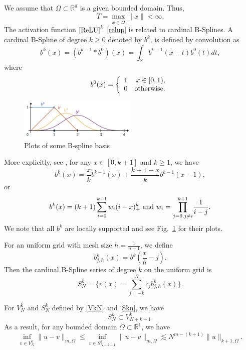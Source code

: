We assume that $\Omega\subset\mathbb R^d$ is a given bounded domain.
Thus,
\begin{equation}
  \label{T}
T=\max_{x\in \bar{\Omega}} \|x\|<\infty.  
\end{equation}
The activation function ${\rm [ ReLU]}^k$ \eqref{relup} is related to
cardinal B-Splines.  A cardinal B-Spline of degree $k\ge 0$
denoted by $b^k$, is defined by convolution as
\begin{equation}
	b^k(x)=(b^{k-1}*b^0)(x)=\int_\mathbb{R}b^{k-1}(x-t)b^0(t)dt,
\end{equation}
where 
\begin{equation}
b^0(x)=\left\{
		     \begin{array}{lr}
		    1 & x\in[0,1),\\
		    0 & \hbox{otherwise}.
		     \end{array}
	\right.
\end{equation}
\begin{figure}
\begin{center}
\includegraphics[width=0.5\textwidth]{6DL/figures/B-spline.png}   
\caption{Plots of some B-spline basis}
\label{bk}
\end{center}
\end{figure}
More explicitly, see \cite{de1971subroutine}, for any
$x\in[0,k+1]$ and $k\geq 1$, we have 
	\begin{equation}
	b^k(x)=\frac{x}{k}b^{k-1}(x)+\frac{k+1-x}{k}b^{k-1}(x-1),
	\end{equation}
or
	\begin{equation}\label{splinetorelu}
	b^k(x)=(k+1)\sum_{i=0}^{k+1} w_i(i-x)_+^k \hbox{~and~} w_i={\displaystyle\prod_{j=0,j\neq i}^{k+1}} \frac{1}{i-j}.
	\end{equation}
We note that all $b^k$ are locally supported and see Fig.~\ref{bk} for their plots. 

For an uniform grid with mesh size $h=\frac{1}{n+1}$, we define
	\begin{equation}
	b^k_{j,h}(x)=b^{k}(\frac{x}{h}-j).
	\end{equation}
Then the cardinal B-Spline series of degree $k$ on the uniform grid is 
\begin{equation}\label{Skn}
S_N^k=\Big\{v(x)=\sum_{j=-k}^{N}	c_jb^k_{j,h}(x)\Big\}.
\end{equation}
\begin{lemma} For $V_N^k$ and $S_N^k$ defined by \eqref{VkN} and
  \eqref{Skn}, we have
\begin{equation}
    \label{SV}
S_N^k\subset V_{N+k+1}^k.    
  \end{equation}
As a result, for any bounded domain $\Omega\subset \mathbb R^1$, we have
\begin{equation}
  \label{SVerror}
\inf_{v\in V_{N}^k}\|u-v\|_{m,\Omega} 
\le \inf_{v\in S_{N-k-1}^k}\|u-v\|_{m,\Omega} \lesssim N^{m-(k+1)} \|u\|_{k+1,\Omega}.
\end{equation}
\end{lemma}

